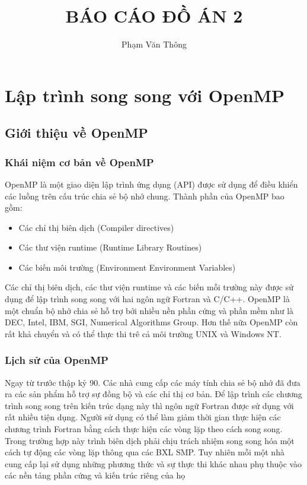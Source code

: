 \documentclass{report}
\begin{document}
\title{BÁO CÁO ĐỒ ÁN 2}
\author{Phạm Văn Thông}
\newpage
\maketitle
\tableofcontents
\chapter{Lập trình song song với OpenMP}
\section{Giới thiệu về OpenMP}
\subsection{Khái niệm cơ bản về OpenMP}
OpenMP là một giao diện lập trình ứng dụng (API) được sử dụng để điều khiển các luồng trên cấu trúc chia sẻ bộ nhớ chung. Thành phần của OpenMP bao gồm:
\begin{itemize}
\item Các chỉ thị biên dịch (Compiler directives)
\item Các thư viện runtime (Runtime Library Routines)
\item Các biến môi trường (Environment Environment Variables)
\end{itemize}

Các chỉ thị biên dịch, các thư viện runtime và các biến mỗi trường này được sử dụng để lập trình song song với hai ngôn ngữ Fortran và C/C++. OpenMP là một chuẩn bộ nhớ chia sẻ hỗ trợ bởi nhiều nền phần cứng và phần mềm như là DEC, Intel, IBM, SGI, Numerical Algorithms Group. Hơn thế nữa OpenMP còn rất khả chuyển và có thể thực thi trê cả môi trường UNIX và Windows NT.


\subsection{Lịch sử của OpenMP}
Ngay từ trước thập kỷ 90. Các nhà cung cấp các máy tính chia sẻ bộ nhớ đã
đưa ra các sản phẩm hỗ trợ sự đồng bộ và các chỉ thị cơ bản. Để lập trình các chương
trình song song trên kiến trúc dạng này thì ngôn ngữ Fortran được sử dụng với rất
nhiều tiện dụng. Người sử dụng có thể làm giảm thời gian thực hiện các chương trình
Fortran bằng cách thực hiện các vòng lặp theo cách song song. Trong trường hợp này
trình biên dịch phải chịu trách nhiệm song song hóa một cách tự động các vòng lặp
thông qua các BXL SMP. Tuy nhiên mỗi một nhà cung cấp lại sử dụng những phương
thức và sự thực thi khác nhau phụ thuộc vào các nền tảng phần cứng và kiến trúc riêng
của họ
\end{document}
